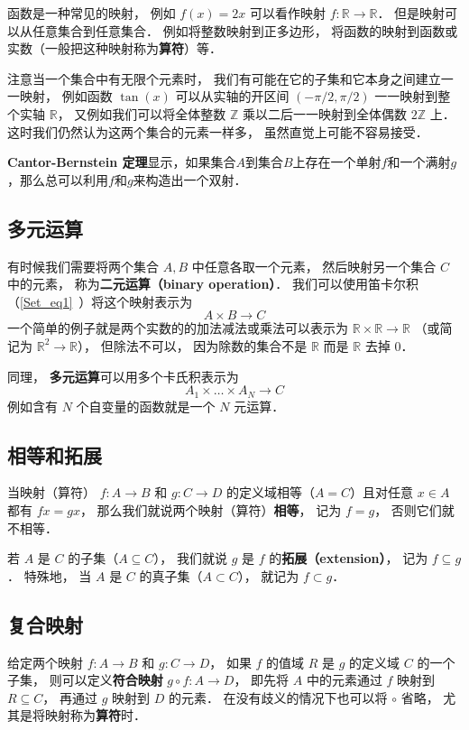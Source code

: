 函数是一种常见的映射， 例如 $f(x) = 2x$ 可以看作映射 $f: \mathbb R \to \mathbb R$． 但是映射可以从任意集合到任意集合． 例如将整数映射到正多边形， 将函数的映射到函数或实数（一般把这种映射称为\textbf{算符}）等．

注意当一个集合中有无限个元素时， 我们有可能在它的子集和它本身之间建立一一映射， 例如函数 $\tan(x)$ 可以从实轴的开区间 $(-\pi/2, \pi/2)$ 一一映射到整个实轴 $\mathbb R$， 又例如我们可以将全体整数 $\mathbb Z$ 乘以二后一一映射到全体偶数 $2\mathbb Z$ 上． 这时我们仍然认为这两个集合的元素一样多， 虽然直觉上可能不容易接受．

\textbf{Cantor-Bernstein 定理}显示，如果集合$A$到集合$B$上存在一个单射$f$和一个满射$g$，那么总可以利用$f$和$g$来构造出一个双射．

\subsection{多元运算}
有时候我们需要将两个集合 $A, B$ 中任意各取一个元素， 然后映射另一个集合 $C$ 中的元素， 称为\textbf{二元运算（binary operation）}． 我们可以使用笛卡尔积（\autoref{Set_eq1}~）将这个映射表示为
\begin{equation}\label{map_eq1}
A \times B \to C
\end{equation}
一个简单的例子就是两个实数的的加法减法或乘法可以表示为 $\mathbb R \times \mathbb R \to \mathbb R$ （或简记为 $\mathbb R^2 \to \mathbb R$）， 但除法不可以， 因为除数的集合不是 $\mathbb R$ 而是 $\mathbb R$ 去掉 $0$．

同理， \textbf{多元运算}可以用多个卡氏积表示为
\begin{equation}
A_1 \times \dots \times A_N \to C
\end{equation}
例如含有 $N$ 个自变量的函数就是一个 $N$ 元运算．

\subsection{相等和拓展}
当映射（算符） $f:A\to B$ 和 $g:C\to D$ 的定义域相等（$A = C$）且对任意 $x\in A$ 都有 $fx = gx$， 那么我们就说两个映射（算符）\textbf{相等}， 记为 $f = g$， 否则它们就不相等．

若 $A$ 是 $C$ 的子集（$A\subseteq C$）， 我们就说 $g$ 是 $f$ 的\textbf{拓展（extension）}， 记为 $f \subseteq g$． 特殊地， 当 $A$ 是 $C$ 的真子集（$A\subset C$）， 就记为 $f \subset g$．

\subsection{复合映射}
给定两个映射 $f:A\to B$ 和 $g:C\to D$， 如果 $f$ 的值域 $R$ 是 $g$ 的定义域 $C$ 的一个子集， 则可以定义\textbf{符合映射} $g\circ f: A\to D$， 即先将 $A$ 中的元素通过 $f$ 映射到 $R \subseteq C$， 再通过 $g$ 映射到 $D$ 的元素． 在没有歧义的情况下也可以将 $\circ$ 省略， 尤其是将映射称为\textbf{算符}时．

